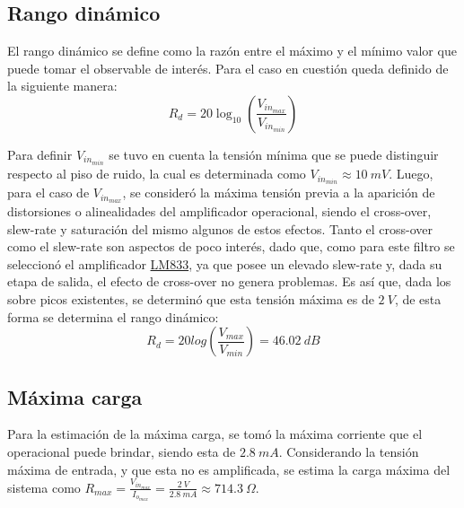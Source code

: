 \subsection{Rango dinámico}
El rango dinámico se define como la razón entre el máximo y el mínimo valor que puede tomar el observable de interés. Para el caso en cuestión queda definido de la siguiente manera:
\begin{equation}
	R_d = 20 \log_{10} \left( \frac{V_{in_{max}}}{V_{in_{min}}} \right)
\end{equation}

Para definir $V_{in_{min}}$ se tuvo en cuenta la tensión mínima que se puede distinguir respecto al piso de ruido, la cual es determinada como $V_{in_{min}} \approx 10 \ mV$. Luego, para el caso de $V_{in_{max}}$, se consideró la máxima tensión previa a la aparición de distorsiones o alinealidades del amplificador operacional, siendo el cross-over, slew-rate y saturación del mismo algunos de estos efectos. Tanto el cross-over como el slew-rate son aspectos de poco interés, dado que, como para este filtro se seleccionó el amplificador \href{http://www.ti.com/lit/ds/symlink/tl082.pdf}{LM833}, ya que posee un elevado slew-rate y, dada su etapa de salida, el efecto de cross-over no genera problemas. Es así que, dada los sobre picos existentes, se determinó que esta tensión máxima es de $2 \ V$, de esta forma se determina el rango dinámico:
\begin{equation}
	R_d = 20 log \left( \frac{V_{max}}{V_{min}} \right) = 46.02 \ dB 
\end{equation}

\subsection{Máxima carga}
Para la estimación de la máxima carga, se tomó la máxima corriente que el operacional puede brindar, siendo esta de $2.8 \ mA$. Considerando la tensión máxima de entrada, y que esta no es amplificada, se estima la carga máxima del sistema como $R_{max} = \frac{V_{in_{max}}}{I_{o_{max}}} = \frac{2 \ V}{ 2.8 \ mA} \approx 714.3 \ \Omega$.

